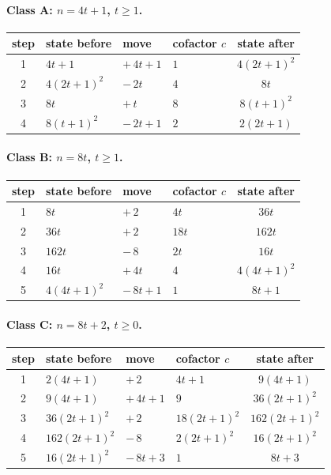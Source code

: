 \paragraph{Class A: $n=4 t + 1$, $t\ge 1$.}
\begin{center}\small\begin{tabular}{@{}clllc@{}}\toprule
step & state before & move & cofactor $c$ & state after\\\midrule
1 & $4 t + 1$ & $+\,4 t + 1$ & $1$ & $4 \left(2 t + 1\right)^{2}$ \\
2 & $4 \left(2 t + 1\right)^{2}$ & $-\,2 t$ & $4$ & $8 t$ \\
3 & $8 t$ & $+\,t$ & $8$ & $8 \left(t + 1\right)^{2}$ \\
4 & $8 \left(t + 1\right)^{2}$ & $-\,2 t + 1$ & $2$ & $2 \left(2 t + 1\right)$ \\
\bottomrule\end{tabular}\end{center}
\paragraph{Class B: $n=8 t$, $t\ge 1$.}
\begin{center}\small\begin{tabular}{@{}clllc@{}}\toprule
step & state before & move & cofactor $c$ & state after\\\midrule
1 & $8 t$ & $+\,2$ & $4 t$ & $36 t$ \\
2 & $36 t$ & $+\,2$ & $18 t$ & $162 t$ \\
3 & $162 t$ & $-\,8$ & $2 t$ & $16 t$ \\
4 & $16 t$ & $+\,4 t$ & $4$ & $4 \left(4 t + 1\right)^{2}$ \\
5 & $4 \left(4 t + 1\right)^{2}$ & $-\,8 t + 1$ & $1$ & $8 t + 1$ \\
\bottomrule\end{tabular}\end{center}
\paragraph{Class C: $n=8 t + 2$, $t\ge 0$.}
\begin{center}\small\begin{tabular}{@{}clllc@{}}\toprule
step & state before & move & cofactor $c$ & state after\\\midrule
1 & $2 \left(4 t + 1\right)$ & $+\,2$ & $4 t + 1$ & $9 \left(4 t + 1\right)$ \\
2 & $9 \left(4 t + 1\right)$ & $+\,4 t + 1$ & $9$ & $36 \left(2 t + 1\right)^{2}$ \\
3 & $36 \left(2 t + 1\right)^{2}$ & $+\,2$ & $18 \left(2 t + 1\right)^{2}$ & $162 \left(2 t + 1\right)^{2}$ \\
4 & $162 \left(2 t + 1\right)^{2}$ & $-\,8$ & $2 \left(2 t + 1\right)^{2}$ & $16 \left(2 t + 1\right)^{2}$ \\
5 & $16 \left(2 t + 1\right)^{2}$ & $-\,8 t + 3$ & $1$ & $8 t + 3$ \\
\bottomrule\end{tabular}\end{center}
